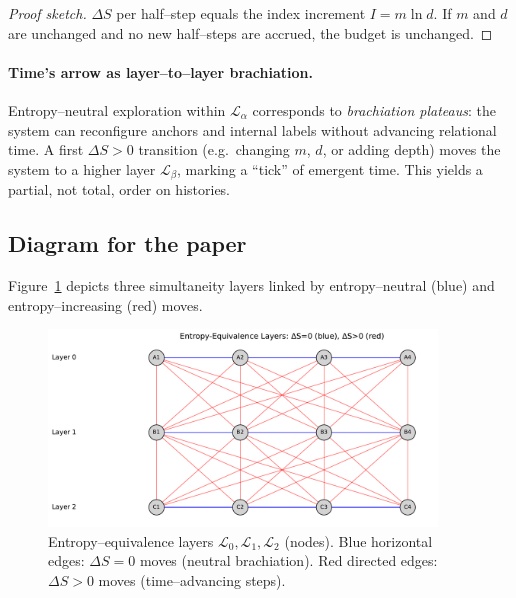 \documentclass[11pt]{article}
\theoremstyle{plain}
\theoremstyle{definition}
\begin{document}
\begin{proof}[Proof sketch]
  $\Delta S$ per half–step equals the index increment $I=m\ln d$.  If $m$ and $d$ are unchanged and no new half–steps are accrued, the budget is unchanged.
\end{proof}

\paragraph{Time’s arrow as layer–to–layer brachiation.}
Entropy–neutral exploration within $\mathcal{L}_\alpha$ corresponds to \emph{brachiation plateaus}: the system can reconfigure anchors and internal labels without advancing relational time.
A first $\Delta S>0$ transition (e.g.\ changing $m$, $d$, or adding depth) moves the system to a higher layer $\mathcal{L}_\beta$, marking a ``tick'' of emergent time.  This yields a partial, not total, order on histories.

\subsection{Diagram for the paper}
Figure~\ref{fig:entropy-layers} depicts three simultaneity layers linked by entropy–neutral (blue) and entropy–increasing (red) moves.
\begin{figure}[h]
  \centering
  \includegraphics[width=0.92\textwidth]{entropy_layers_diagram.pdf}
  \caption{Entropy–equivalence layers $\mathcal{L}_0,\mathcal{L}_1,\mathcal{L}_2$ (nodes).
    Blue horizontal edges: $\Delta S=0$ moves (neutral brachiation).
  Red directed edges: $\Delta S>0$ moves (time–advancing steps).}
  \label{fig:entropy-layers}
\end{figure}
\end{document}
